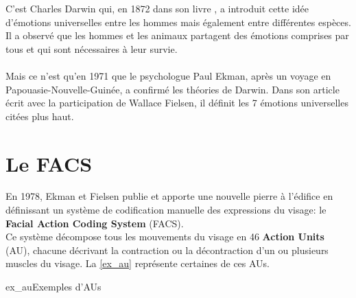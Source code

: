 \documentclass[overfullbox, poster]{polytech/polytech}
\begin{document}
C'est Charles Darwin qui, en 1872 dans son livre \cite{darwin}, a introduit cette idée d'émotions universelles entre les hommes mais également entre différentes espèces. Il a observé que les hommes et les animaux partagent des émotions comprises par tous et qui sont nécessaires à leur survie.\\
\\
Mais ce n'est qu'en 1971 que le psychologue Paul Ekman, après un voyage en Papouasie-Nouvelle-Guinée, a confirmé les théories de Darwin. Dans son article \cite{ekman} écrit avec la participation de Wallace Fielsen, il définit les 7 émotions universelles citées plus haut.\\

\section{Le FACS}
\label{sec:facs}

En 1978, Ekman et Fielsen publie \cite{ekman2} et apporte une nouvelle pierre à l'édifice en définissant un système de codification manuelle des expressions du visage: le \textbf{Facial Action Coding System} (FACS).\\
Ce système décompose tous les mouvements du visage en 46 \textbf{Action Units} (AU), chacune décrivant la contraction ou la décontraction d'un ou plusieurs muscles du visage. La \autoref{ex_au} représente certaines de ces AUs.\\

\begin{Figure}{ex_au}{Exemples d'AUs}
\end{Figure}
\end{document}
